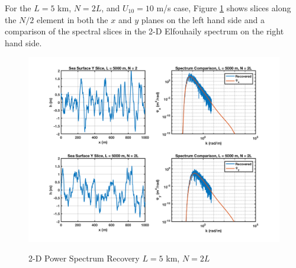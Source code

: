 For the $L = 5$ km, $N = 2L$, and $U_{10} = 10$ m/s case, Figure \ref{os_fig:11a} shows slices along the $N/2$ element in both the $x$ and $y$ planes on the left hand side and a comparison of the spectral slices in the 2-D Elfouhaily spectrum on the right hand side.
\begin{figure}[H]
  \begin{center}
\includegraphics[width=6in]{../media/Ocean_Surface/sea_surface_2d_slices_5000.png}
  \end{center}
  \renewcommand{\baselinestretch}{1} \small\normalsize
  \begin{quote}
    \caption[2-D Power Spectrum Recovery $L = 5$ km, $N = 2L$]{2-D Power Spectrum Recovery $L = 5$ km, $N = 2L$\label{os_fig:11a}}
  \end{quote}
\end{figure}
\renewcommand{\baselinestretch}{2} \small\normalsize
 
